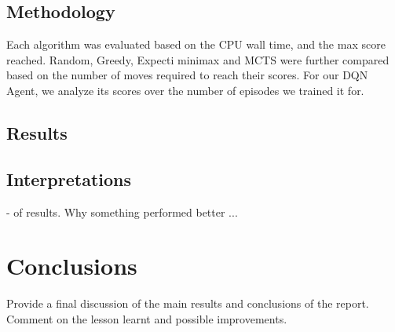 \documentclass{svproc}
\begin{document}
		\subsection{Methodology}
		 Each algorithm was evaluated based on the CPU wall time, and the max score reached. Random, Greedy, Expecti minimax and MCTS were further compared based on the number of moves required to reach their scores. For our DQN Agent, we analyze its scores over the number of episodes we trained it for.
		\subsection{Results}
		
		\subsection{Interpretations}
			- of results. Why something performed better ...
    \section{Conclusions}
    Provide a final discussion of the main results and conclusions of the report. Comment on the lesson learnt and possible improvements.



    
    
    
\end{document}
